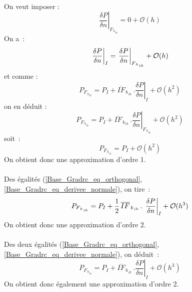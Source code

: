 \\
On veut imposer :
\begin{equation}
\left. \displaystyle\frac{\delta P}{\delta n}\right|_{F_{\,b_{\,ik}}} = 0 + \mathcal{O}(h)
\end{equation}
On a~:
\begin{equation}\notag
\left. \displaystyle\frac{\delta P}{\delta n}\right|_{I} =
\displaystyle\left. \displaystyle\frac{\delta P}{\delta
n}\right|_{F_{\,b_{\,ik}}} + \mathcal{O}(h)
\end{equation}
et comme :
\begin{equation}
P_{F_{\,b_{\,ik}}} = P_I + \overline{IF}_{\,b_{\,ik}}\,.\left. \displaystyle\frac{\delta P}{\delta
n}\right|_I + \mathcal{O}(h^2)
\end{equation}
on en d\'eduit :
\begin{equation}
P_{F_{\,b_{\,ik}}} = P_I + \overline{IF}_{\,b_{\,ik}}\,.\left. \displaystyle\frac{\delta P}{\delta
n}\right|_{F_{\,b_{\,ik}}} + \mathcal{O}(h^2)
\end{equation}
soit~:
\begin{equation}
P_{F_{\,b_{\,ik}}} = P_I +  \mathcal{O}(h^2)
\end{equation}
On obtient donc une approximation d'ordre 1.\\
\\
Des \'egalit\'es (\ref{Base_Gradrc_eq_orthogonal}, \ref{Base_Gradrc_eq_derivee_normale}), on tire~:
\begin{equation}\notag
P_{F_{\,b_{\,ik}}} = P_I +
\displaystyle\frac{1}{2}\,\overline{IF}_{\,b_{\,ik}}\,.\,\left. \displaystyle\frac{\delta P}{\delta
n}\right|_{I} + \mathcal{O}(h^3)
\end{equation}
On obtient donc une approximation d'ordre 2.\\
\\
Des deux \'egalit\'es (\ref{Base_Gradrc_eq_orthogonal}, \ref{Base_Gradrc_eq_derivee_normale}), on d\'eduit~:
\begin{equation}
P_{F_{\,b_{\,ik}}}= P_I + \overline{IF}_{\,b_{\,ik}}\,.\left. \displaystyle\frac{\delta P}{\delta
n}\right|_{I} + \mathcal{O}(h^3)
\end{equation}
On obtient donc \'egalement une approximation d'ordre 2.\\
